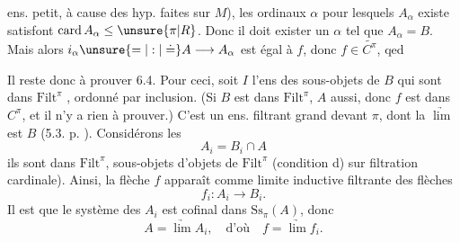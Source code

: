 ens. petit, à cause des hyp. faites sur $M$), les ordinaux $\alpha$ pour lesquels $A_\alpha$ existe satisfont $\operatorname{card}A_\alpha\leq\unsure{\pi|R}$. Donc il doit exister un  $\alpha$ tel que $A_\alpha=B$. Mais alors $i_\alpha\unsure{=|:|\doteq} A\longrightarrow A_\alpha$ est égal à $f$, donc $f\in\widetilde{C^\pi}$, qed

Il reste donc à prouver 6.4. Pour ceci, soit $I$ l'ens des sous-objets de $B$ qui sont dans $\mathrm{Filt}^\pi$ , ordonné par inclusion. (Si $B$ est dans $\mathrm{Filt}^\pi$, $A$ aussi, donc $f$ est  dans $C^\pi$, et il n'y a rien à prouver.) C'est un ens. filtrant grand devant $\pi$,  dont la $\underrightarrow{\lim}$ est $B$ (5.3. p. ). Considérons les
\[
 A_i=B_i\cap A
\]
ils sont dans $\mathrm{Filt}^\pi$,  sous-objets d'objets de $\mathrm{Filt}^\pi$ (condition d) sur  filtration cardinale). Ainsi, la flèche $f$ apparaît comme limite inductive filtrante des flèches 
\[
 f_i:A_i\to B_i .
\]
Il est  que le système des $A_i$ est cofinal dans $\mathrm{Ss}_\pi(A)$, donc
\[
 A=\underrightarrow{\lim}A_i,\quad\text{d'où}\quad f=\underrightarrow{\lim}f_i.
\]
